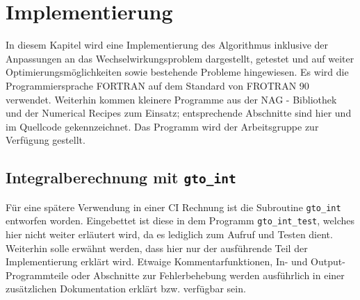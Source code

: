 %
\chapter{Implementierung}\label{sec:Implementierung}
%
In diesem Kapitel wird eine Implementierung des Algorithmus inklusive 
der 
Anpassungen an das Wechselwirkungsproblem dargestellt, getestet und auf weiter 
Optimierungsmöglichkeiten sowie bestehende Probleme hingewiesen. Es wird die 
Programmiersprache FORTRAN auf dem Standard von FROTRAN 90 verwendet. 
Weiterhin 
kommen kleinere Programme aus der NAG - Bibliothek \cite{o:1a} und der 
Numerical 
Recipes \cite{b:4a} zum Einsatz; entsprechende Abschnitte sind hier 
und im Quellcode gekennzeichnet. Das Programm wird der Arbeitsgruppe zur 
Verfügung gestellt. 
%
%
%
\section{Integralberechnung mit \texttt{gto\_int}}
%
Für eine spätere Verwendung in einer CI Rechnung ist die Subroutine 
\texttt{gto\_int} 
entworfen worden. Eingebettet ist diese in dem Programm 
\texttt{gto\_int\_test}, 
welches hier 
nicht weiter erläutert wird, da es lediglich zum Aufruf und Testen 
dient. 
Weiterhin solle erwähnt werden, dass hier nur der ausführende Teil 
der 
Implementierung erklärt wird. Etwaige Kommentarfunktionen, In- und 
Output-Programmteile oder Abschnitte zur Fehlerbehebung werden ausführlich in 
einer zusätzlichen Dokumentation erklärt bzw. verfügbar sein.    
%
%
%
